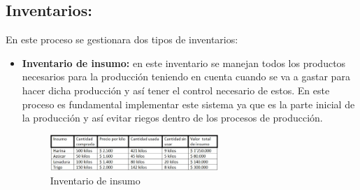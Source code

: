 \subsection{Inventarios:} En este proceso se gestionara dos tipos de inventarios:
	\begin{itemize}
		\item \textbf{Inventario de insumo:} en este inventario se manejan todos los productos necesarios para la producci\'on teniendo en cuenta cuando se va a gastar  para hacer dicha producci\'on y as\'i tener el control necesario de estos. En este proceso es fundamental implementar este sistema ya que es la parte inicial de la producci\'on y as\'i evitar riegos dentro de los procesos de producci\'on.
\begin{figure}[htbp]
	\centering
		\includegraphics[width=0.60\textwidth]{images/inventarioinsumo.jpg}
	\caption{Inventario de insumo}
	\label{fig:Inventario de insumo}
\end{figure}%
%	
	

\end{itemize}
